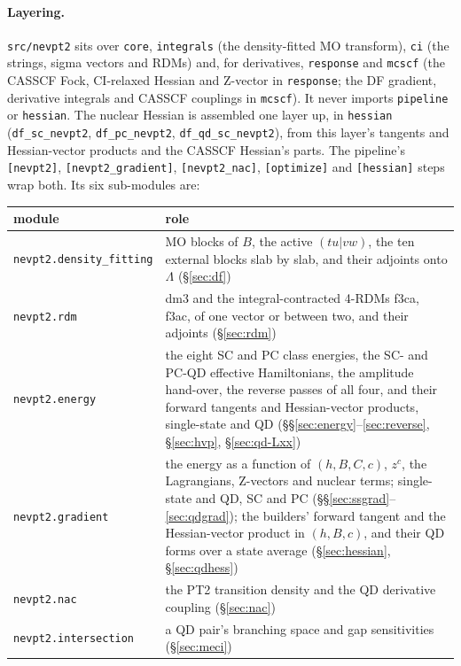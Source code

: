 \documentclass[11pt]{article}
\newcommand{\code}[1]{\texttt{#1}}
\newcommand{\Lb}{\Lambda}
\begin{document}
\paragraph{Layering.} \code{src/nevpt2} sits over \code{core},
\code{integrals} (the density-fitted MO transform), \code{ci} (the strings,
sigma vectors and RDMs) and, for derivatives, \code{response} and
\code{mcscf} (the CASSCF Fock, CI-relaxed Hessian and Z-vector in
\code{response}; the DF gradient, derivative integrals and CASSCF couplings
in \code{mcscf}). It never imports \code{pipeline} or \code{hessian}. The
nuclear Hessian is assembled one layer up, in \code{hessian}
(\code{df\_sc\_nevpt2}, \code{df\_pc\_nevpt2}, \code{df\_qd\_sc\_nevpt2}), from this layer's tangents
and Hessian-vector products and the CASSCF Hessian's parts. The pipeline's
\code{[nevpt2]}, \code{[nevpt2\_gradient]}, \code{[nevpt2\_nac]},
\code{[optimize]} and \code{[hessian]} steps wrap both. Its six sub-modules are:

\begin{center}
\small
\begin{tabularx}{\linewidth}{@{}lX@{}}
\toprule
module & role \\
\midrule
\code{nevpt2.density\_fitting} & MO blocks of $B$, the active $(tu|vw)$, the ten external blocks slab by slab, and their adjoints onto $\Lb$ (\S\ref{sec:df}) \\
\code{nevpt2.rdm} & dm3 and the integral-contracted 4-RDMs f3ca, f3ac, of one vector or between two, and their adjoints (\S\ref{sec:rdm}) \\
\code{nevpt2.energy} & the eight SC and PC class energies, the SC- and PC-QD effective Hamiltonians, the amplitude hand-over, the reverse passes of all four, and their forward tangents and Hessian-vector products, single-state and QD (\S\S\ref{sec:energy}--\ref{sec:reverse}, \S\ref{sec:hvp}, \S\ref{sec:qd-Lxx}) \\
\code{nevpt2.gradient} & the energy as a function of $(h, B, C, c)$, $z^c$, the Lagrangians, Z-vectors and nuclear terms; single-state and QD, SC and PC (\S\S\ref{sec:ssgrad}--\ref{sec:qdgrad}); the builders' forward tangent and the Hessian-vector product in $(h, B, c)$, and their QD forms over a state average (\S\ref{sec:hessian}, \S\ref{sec:qdhess}) \\
\code{nevpt2.nac} & the PT2 transition density and the QD derivative coupling (\S\ref{sec:nac}) \\
\code{nevpt2.intersection} & a QD pair's branching space and gap sensitivities (\S\ref{sec:meci}) \\
\bottomrule
\end{tabularx}
\end{center}
\end{document}
